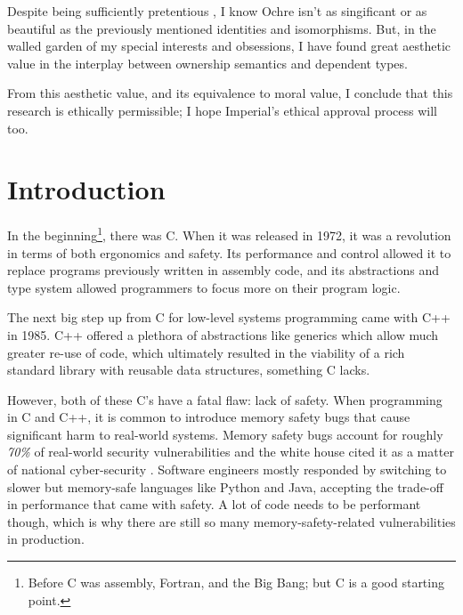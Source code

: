 \documentclass[12pt,twoside]{report}
\begin{document}
Despite being sufficiently pretentious \cite[Ethical Considerations]{lidburyOchreDependentlyTyped2024}, I know Ochre isn't as singificant or as beautiful as the previously mentioned identities and isomorphisms. But, in the walled garden of my special interests and obsessions, I have found great aesthetic value in the interplay between ownership semantics and dependent types.

From this aesthetic value, and its equivalence to moral value, I conclude that this research is ethically permissible; I hope Imperial's ethical approval process will too.

\clearpage{\pagestyle{empty}\cleardoublepage}

{\small
\begingroup
\setlength{\parskip}{0pt} %
\setlength{\parindent}{0pt} %
\renewcommand{\baselinestretch}{0.9} %
\tableofcontents
\endgroup
}


\setcounter{page}{1}
\fancyhead[LE,RO]{\slshape \rightmark}
\fancyhead[LO,RE]{\slshape \leftmark}

\chapter{Introduction}
In the beginning\footnote{Before C was assembly, Fortran, and the Big Bang; but C is a good starting point.}, there was C. When it was released in 1972, it was a revolution in terms of both ergonomics and safety. Its performance and control allowed it to replace programs previously written in assembly code, and its abstractions and type system allowed programmers to focus more on their program logic.

The next big step up from C for low-level systems programming came with C++ in 1985. C++ offered a plethora of abstractions like generics which allow much greater re-use of code, which ultimately resulted in the viability of a rich standard library with reusable data structures, something C lacks.

However, both of these C's have a fatal flaw: lack of safety. When programming in C and C++, it is common to introduce memory safety bugs that cause significant harm to real-world systems. Memory safety bugs account for roughly \textit{70\%} of real-world security vulnerabilities \citep{ProactiveApproachMore, MemorySafety} and the white house cited it as a matter of national cyber-security \citep[p. 8]{officeofthenationalcyberdirectorBackBuildingBlocks2024}. Software engineers mostly responded by switching to slower but memory-safe languages like Python and Java, accepting the trade-off in performance that came with safety. A lot of code needs to be performant though, which is why there are still so many memory-safety-related vulnerabilities in production.
\end{document}
